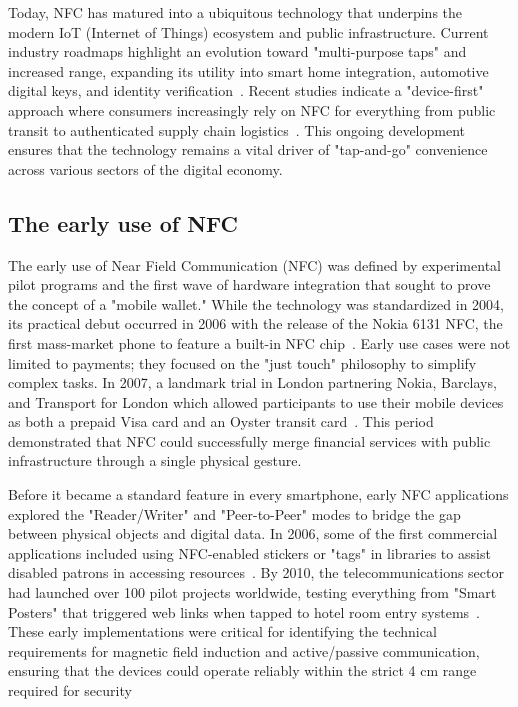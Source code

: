 \documentclass[sigconf, nonacm]{acmart}
\begin{document}
Today, NFC has matured into a ubiquitous technology that underpins the modern IoT (Internet of Things) ecosystem and public infrastructure. Current industry roadmaps highlight an evolution toward "multi-purpose taps" and increased range, expanding its utility into smart home integration, automotive digital keys, and identity verification~\cite{staff2023nfc}. Recent studies indicate a "device-first" approach where consumers increasingly rely on NFC for everything from public transit to authenticated supply chain logistics~\cite{nfcforum2024device}. This ongoing development ensures that the technology remains a vital driver of "tap-and-go" convenience across various sectors of the digital economy.

\subsection{The early use of NFC}

The early use of Near Field Communication (NFC) was defined by experimental pilot programs and the first wave of hardware integration that sought to prove the concept of a "mobile wallet." While the technology was standardized in 2004, its practical debut occurred in 2006 with the release of the Nokia 6131 NFC, the first mass-market phone to feature a built-in NFC chip~\cite{nokia2007nfc}. Early use cases were not limited to payments; they focused on the "just touch" philosophy to simplify complex tasks. In 2007, a landmark trial in London partnering Nokia, Barclays, and Transport for London which allowed participants to use their mobile devices as both a prepaid Visa card and an Oyster transit card~\cite{kaiser2017nfc}. This period demonstrated that NFC could successfully merge financial services with public infrastructure through a single physical gesture.

Before it became a standard feature in every smartphone, early NFC applications explored the "Reader/Writer" and "Peer-to-Peer" modes to bridge the gap between physical objects and digital data. In 2006, some of the first commercial applications included using NFC-enabled stickers or "tags" in libraries to assist disabled patrons in accessing resources~\cite{lathiya2021near}. By 2010, the telecommunications sector had launched over 100 pilot projects worldwide, testing everything from "Smart Posters" that triggered web links when tapped to hotel room entry systems~\cite{tardi2023near}. These early implementations were critical for identifying the technical requirements for magnetic field induction and active/passive communication, ensuring that the devices could operate reliably within the strict 4 cm range required for security~\cite{singh2020near}
\end{document}
